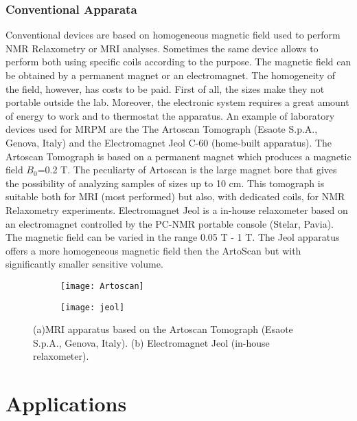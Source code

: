 \documentclass[a4paper,11pt]{report}
\begin{document}
\subsection{Conventional Apparata}

Conventional devices are based on homogeneous magnetic field used to perform NMR Relaxometry or MRI analyses. Sometimes the same device allows to perform both using specific coils according to the purpose. The magnetic field can be obtained by a permanent magnet or an electromagnet. The homogeneity of the field, however, has costs to be paid. First of all, the sizes make they not portable outside the lab. Moreover, the electronic system requires a great amount of energy to work and to thermostat the apparatus.  
An example of laboratory devices used for MRPM are the The Artoscan Tomograph (Esaote S.p.A., Genova, Italy) and the Electromagnet Jeol C-60 (home-built apparatus).
The Artoscan Tomograph is based on a permanent magnet which produces a magnetic field $B_0$=0.2 T. The peculiarty of Artoscan is the large magnet bore that gives the possibility of analyzing samples of sizes up to 10 cm. This tomograph is suitable both for MRI (most performed) but also, with dedicated coils, for NMR Relaxometry experiments. 
Electromagnet Jeol is a in-house relaxometer based on an electromagnet controlled by the PC-NMR portable console (Stelar, Pavia). The magnetic field can be varied in the range 0.05 T - 1 T. The Jeol apparatus offers a more homogeneous magnetic field then the ArtoScan but with significantly smaller sensitive volume.

\begin{figure}[h]
\begin{subfigure}{0.5\textwidth}
\texttt{[image: Artoscan]} 
\caption{}
\label{fig:subim1}
\end{subfigure}
\begin{subfigure}{0.5\textwidth}
\texttt{[image: jeol]}
\caption{}
\label{fig:subim2}
\end{subfigure}
 


\caption{(a)MRI apparatus based on the Artoscan Tomograph (Esaote S.p.A., Genova, Italy). (b) Electromagnet Jeol (in-house relaxometer). }
\end{figure}

\newpage

\chapter{Applications}
\end{document}
